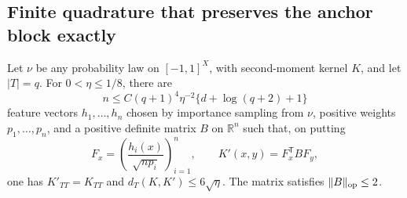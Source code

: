 \subsection{Finite quadrature that preserves the anchor block exactly}

\begin{lemma}
\label{lem:critical-exact-anchor-quadrature}
Let $\nu$ be any probability law on $[-1,1]^X$, with second-moment
kernel $K$, and let $|T|=q$. For $0<\eta\le1/8$, there are
\[
 n\le C(q+1)^4\eta^{-2}\{d+\log(q+2)+1\}
\]
feature vectors $h_1,\ldots,h_n$ chosen by importance sampling from
$\nu$, positive weights
$p_1,\ldots,p_n$, and a positive definite matrix $B$ on
$\mathbb R^n$ such that, on putting
\[
 F_x=\left(\frac{h_i(x)}{\sqrt{np_i}}\right)_{i=1}^n,
 \qquad K'(x,y)=F_x^{\mathsf T}BF_y,
\]
one has $K'_{TT}=K_{TT}$ and $d_T(K,K')\le6\sqrt\eta$.
The matrix satisfies $\|B\|_{\rm op}\le2$.
\end{lemma}

